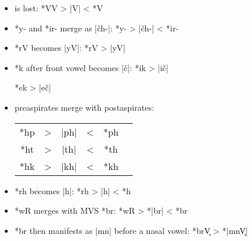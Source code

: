 \documentclass[output=paper]{LSP/langsci}
\begin{document}
\begin{itemize}
\item {} is lost: \hspace{4.2em} *VV	>	|V|	<	*V

\item *y- and *ir- merge as |\v{c}h-|: \hspace{2em} *y-	>	|\v{c}h-|	<	*ir-

\item *rV becomes |yV|:	 \hspace{5.3em} *rV	>	|yV|

\item *k after front vowel becomes |\v{c}|: \hspace{1em} *ik	>	|i\v{c}|

\hspace{14.2em} *ek	>	|e\v{c}|

\item preaspirates merge with postaspirates:



\begin{tabular}[t]{c c c c c c }
*hp & > & |ph| & < & *ph \\
*ht	& > & |th| & < & *th \\
*hk & > & |kh| & < & *kh \\
\end{tabular}

\item *rh becomes |h|: \hspace{4em} *rh	>	|h|	<	*h

\item *wR merges with MVS *br: \hspace{1em}*wR	>	*|br|	<	*br
\item  {} *br then manifests as |mn| before a nasal vowel:              *br\k{V}    >          *|mn\k{V}|
\end{itemize}

\end{document}
